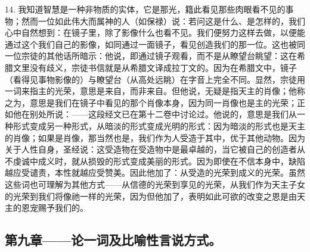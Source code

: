 14. 我知道智慧是一种非物质的实体，它是那光，籍此看见那些肉眼看不见的事物；然而一位如此伟大而属神的人（如保禄）说：若问这是什么、是怎样的，我们心中自然想到：在镜子里，除了影像什么也看不见。我们便努力这样去做，以便能通过这个我们自己的影像，如同通过一面镜子，看见创造我们的那一位。这也被同一位宗徒的其他话所暗示：他说，即通过镜子观看，而不是从瞭望台眺望：这在希腊文里没有歧义，宗徒书信就是从希腊文译成拉丁文的。因为在希腊文中，镜子（看得见事物影像的）与瞭望台（从高处远眺）在字音上完全不同。显然，宗徒用一词来指主的光荣，意思是来自，而非来自。但他说，无疑是指天主的肖像；他称之为，意思是我们在镜子中看见的那个肖像本身，因为同一肖像也是主的光荣；正如他在别处所说：——这段经文已在第十二卷中讨论过。他说的，意思是我们从一种形式变成另一种形式，从暗淡的形式变成光明的形式：因为暗淡的形式也是天主的肖像；如果是肖像，那当然也是，我们作为人受造于其中，优于其他动物。因为关于人性自身，圣经说：这受造物在受造物中是最卓越的，当它被自己的创造者从不虔诚中成义时，就从损毁的形式变成美丽的形式。因为即使在不信本身中，缺陷越应受谴责，本性就越应受赞美。因此他加了：从受造的光荣到成义的光荣。虽然这些词也可理解为其他方式——从信德的光荣到享见的光荣，从我们作为天主子女的光荣到我们将像祂一样的光荣，因为但他加了，表明如此可欲的改变之恩是由天主的恩宠赐予我们的。\par


\subsection{第九章——论一词及比喻性言说方式。}

